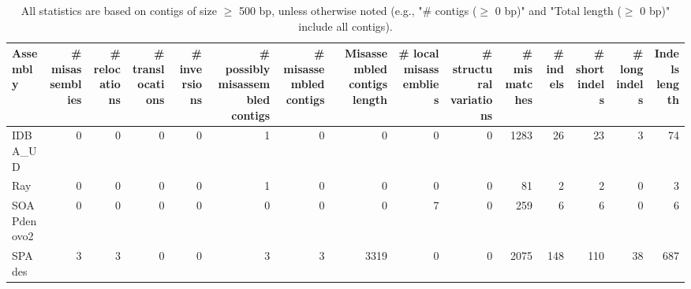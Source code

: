 \documentclass[12pt,a4paper]{article}
\begin{document}
\begin{table}[ht]
\begin{center}
\caption{All statistics are based on contigs of size $\geq$ 500 bp, unless otherwise noted (e.g., "\# contigs ($\geq$ 0 bp)" and "Total length ($\geq$ 0 bp)" include all contigs).}
\begin{tabular}{|l*{14}{|r}|}
\hline
Assembly & \# misassemblies &     \# relocations &     \# translocations &     \# inversions & \# possibly misassembled contigs & \# misassembled contigs & Misassembled contigs length & \# local misassemblies & \# structural variations & \# mismatches & \# indels &     \# short indels &     \# long indels & Indels length \\ \hline
IDBA\_UD & 0 & 0 & 0 & 0 & 1 & 0 & 0 & 0 & 0 & 1283 & 26 & 23 & 3 & 74 \\ \hline
Ray & 0 & 0 & 0 & 0 & 1 & 0 & 0 & 0 & 0 & 81 & 2 & 2 & 0 & 3 \\ \hline
SOAPdenovo2 & 0 & 0 & 0 & 0 & 0 & 0 & 0 & 7 & 0 & 259 & 6 & 6 & 0 & 6 \\ \hline
SPAdes & 3 & 3 & 0 & 0 & 3 & 3 & 3319 & 0 & 0 & 2075 & 148 & 110 & 38 & 687 \\ \hline
\end{tabular}
\end{center}
\end{table}
\end{document}
